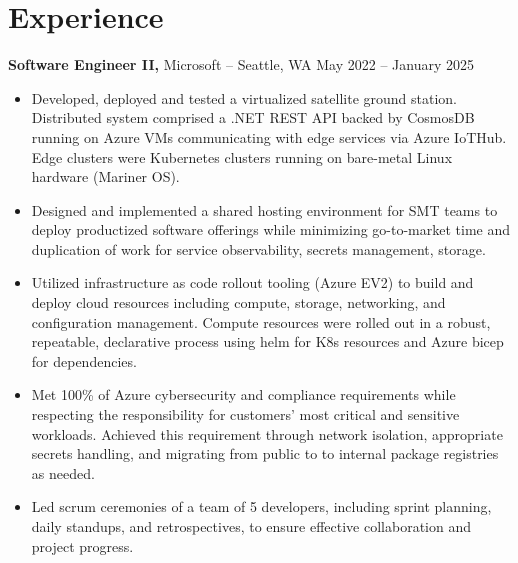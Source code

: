 \documentclass[11pt]{article}       %
\begin{document}
\section*{Experience}
\textbf{Software Engineer II,} {Microsoft} -- Seattle, WA \hfill May 2022 -- January 2025 \\
\vspace{-9pt}
\begin{itemize}
  \item Developed, deployed and tested a virtualized satellite ground station. Distributed system comprised a .NET REST API backed by CosmosDB running on Azure VMs communicating with edge services via Azure IoTHub. Edge clusters were Kubernetes clusters running on bare-metal Linux hardware (Mariner OS).
  \item Designed and implemented a shared hosting environment for SMT teams to deploy productized software offerings while minimizing go-to-market time and duplication of work for service observability, secrets management, storage.
  \item Utilized infrastructure as code rollout tooling (Azure EV2) to build and deploy cloud resources including compute, storage, networking, and configuration management. Compute resources were rolled out in a robust, repeatable, declarative process using helm for K8s resources and Azure bicep for dependencies.
  \item Met 100\% of Azure cybersecurity and compliance requirements while respecting the responsibility for customers' most critical and sensitive workloads. Achieved this requirement through network isolation, appropriate secrets handling, and migrating from public to to internal package registries as needed.
  \item Led scrum ceremonies of a team of 5 developers, including sprint planning, daily standups, and retrospectives, to ensure effective collaboration and project progress.
\end{itemize}
\end{document}
